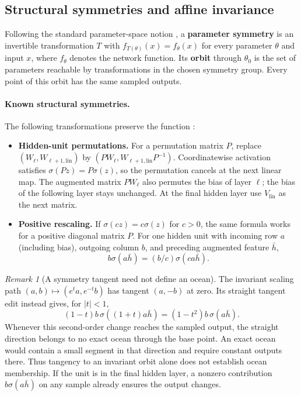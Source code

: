 \documentclass[twoside]{article}
\theoremstyle{remark}
\newtheorem{remark}[theorem]{Remark}
\theoremstyle{highlightdefinition}
\theoremstyle{remark}
\begin{document}
\subsection{Structural symmetries and affine invariance}
Following the standard parameter-space notion \citep{godfrey2022symmetries}, a \textbf{parameter symmetry} is an invertible transformation $T$ with $f_{T(\theta)}(x)=f_\theta(x)$ for every parameter $\theta$ and input $x$, where $f_\theta$ denotes the network function. Its \textbf{orbit} through $\theta_0$ is the set of parameters reachable by transformations in the chosen symmetry group. Every point of this orbit has the same sampled outputs.

\paragraph{Known structural symmetries.}
The following transformations preserve the function \citep{godfrey2022symmetries}:
\begin{itemize}
\item \textbf{Hidden-unit permutations.} For a permutation matrix $P$, replace $(W_\ell,W_{\ell+1,\mathrm{lin}})$ by $(PW_\ell,W_{\ell+1,\mathrm{lin}}P^{-1})$. Coordinatewise activation satisfies $\sigma(Pz)=P\sigma(z)$, so the permutation cancels at the next linear map. The augmented matrix $PW_\ell$ also permutes the bias of layer $\ell$; the bias of the following layer stays unchanged. At the final hidden layer use $V_{\mathrm{lin}}$ as the next matrix.
\item \textbf{Positive rescaling.} If $\sigma(cz)=c\sigma(z)$ for $c>0$, the same formula works for a positive diagonal matrix $P$. For one hidden unit with incoming row $a$ (including bias), outgoing column $b$, and preceding augmented feature $\bar h$,
\[
 b\sigma(a\bar h)=(b/c)\sigma(ca\bar h).
\]
\end{itemize}

\begin{remark}[A symmetry tangent need not define an ocean]
The invariant scaling path $(a,b)\mapsto(e^t a,e^{-t}b)$ has tangent $(a,-b)$ at zero. Its straight tangent edit instead gives, for $|t|<1$,
\[
 (1-t)b\,\sigma((1+t)a\bar h)=(1-t^2)b\,\sigma(a\bar h).
\]
Whenever this second-order change reaches the sampled output, the straight direction belongs to no exact ocean through the base point. An exact ocean would contain a small segment in that direction and require constant outputs there. Thus tangency to an invariant orbit alone does not establish ocean membership. If the unit is in the final hidden layer, a nonzero contribution $b\sigma(a\bar h)$ on any sample already ensures the output changes.
\end{remark}
\end{document}
